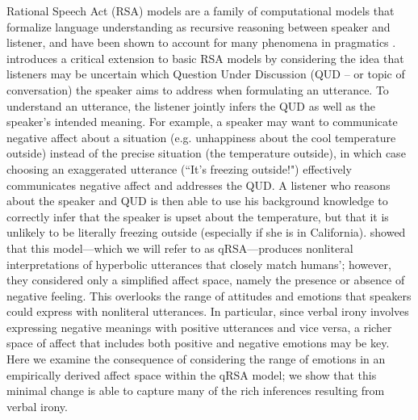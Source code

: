 \documentclass[10pt,letterpaper]{article}
\begin{document}
Rational Speech Act (RSA) models are a family of computational models that formalize language understanding as recursive reasoning between speaker and listener, and have been shown to account for many phenomena in pragmatics \cite{frank2012predicting, goodman2013knowledge}.  introduces a critical extension to basic RSA models by considering the idea that listeners may be uncertain which Question Under Discussion (QUD -- or topic of conversation) the speaker aims to address when formulating an utterance. To understand an utterance, the listener jointly infers the QUD as well as the speaker's intended meaning. For example, a speaker may want to communicate negative affect about a situation (e.g. unhappiness about the cool temperature outside) instead of the precise situation (the temperature outside), in which case choosing an exaggerated utterance (``It's freezing outside!") effectively communicates negative affect and addresses the QUD. A listener who reasons about the speaker and QUD is then able to use his background knowledge to correctly infer that the speaker is upset about the temperature, but that it is unlikely to be literally freezing outside (especially if she is in California). 
 showed that this model---which we will refer to as qRSA---produces nonliteral interpretations of hyperbolic utterances that closely match humans'; however, they considered only a simplified affect space, namely the presence or absence of negative feeling. This overlooks the range of attitudes and emotions that speakers could express with nonliteral utterances. In particular, since verbal irony involves expressing negative meanings with positive utterances and vice versa, a richer space of affect that includes both positive and negative emotions may be key. Here we examine the consequence of considering the range of emotions in an empirically derived affect space within the qRSA model; we show that this minimal change is able to capture many of the rich inferences resulting from verbal irony.



\end{document}
